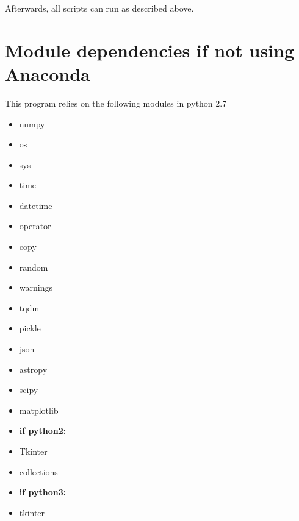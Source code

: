 \documentclass[10pt,a4paper]{article}
\begin{document}
Afterwards, all scripts can run as described above.





\appendix

\section{Module dependencies if not using Anaconda}
\label{section:module_dependency}
\noindent This program relies on the following modules in python 2.7

\begin{itemize}\itemsep0em
\item numpy
\item os
\item sys
\item time
\item datetime
\item operator
\item copy
\item random
\item warnings
\item tqdm
\item pickle
\item json
\item astropy
\item scipy
\item matplotlib
\item[] {\bf if python2:}
\item Tkinter
\item collections
\item[] {\bf if python3:}
\item tkinter
\end{itemize}

\end{document}
